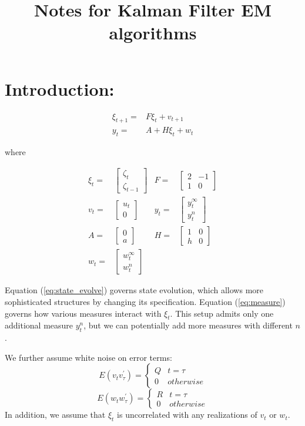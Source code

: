 \documentclass[12pt]{article}
\numberwithin{equation}{section}
\begin{document}
\title{Notes for Kalman Filter EM algorithms}

\section{Introduction:}


\begin{align}
    \xi_{t+1} = & F\xi_{t} +v_{t+1} \label{eq:state_evolve} \\
    y_t = & A + H\xi_{t} + w_t \label{eq:measure}
\end{align}

where 

\begin{align*}
    \xi_t = & \begin{bmatrix}\zeta_{t} \\ \zeta_{t-1}\end{bmatrix} &
    F = & \begin{bmatrix}2 & -1 \\ 1 & 0\end{bmatrix} \\
    v_{t} = & \begin{bmatrix}u_t \\ 0\end{bmatrix} &
    y_t = & \begin{bmatrix}y_t^{\infty} \\ y_t^n\end{bmatrix} \\
    A = & \begin{bmatrix}0 \\ a\end{bmatrix} &
    H = & \begin{bmatrix}1 & 0 \\ h & 0\end{bmatrix} \\
    w_t = & \begin{bmatrix}w_t^{\infty} \\ w_t^n\end{bmatrix}
\end{align*}

Equation (\ref{eq:state_evolve}) governs state evolution, which allows more sophisticated structures by changing its specification. Equation (\ref{eq:measure}) governs how various measures interact with ${\xi_t}$. This setup admits only one additional measure $y_t^n$, but we can potentially add more measures with different $n$. 

We further assume white noise on error terms: 
\[
    E(v_{t}v_{\tau}^{'})=\begin{cases}
        Q & t=\tau \\
        0 & otherwise
    \end{cases} 
\]
\[
    E(w_{t}w_{\tau}^{'})=\begin{cases}
        R & t=\tau \\
        0 & otherwise
    \end{cases}
\]
In addition, we assume that $\xi_t$ is uncorrelated with any realizations of $v_t$ or $w_t$.
\end{document}
